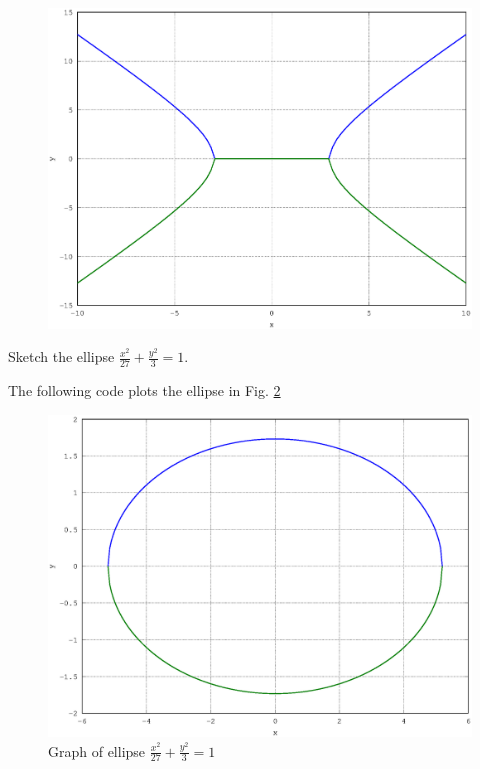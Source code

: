 \documentclass[journal,12pt,twocolumn]{IEEEtran}
\begin{document}
\begin{figure}
\begin{center}
\includegraphics[width=\columnwidth]{./version_2/ee16b1012/ee16b1012}
\end{center}
\label{fig_12}	
\end{figure}
%
\begin{problem}
Sketch the ellipse $\frac{x^2}{27} + \frac{y^2}{3} = 1$.
\end{problem}
\solution The following code plots the ellipse in Fig. \ref{fig_13}

\begin{figure}[h]
\centering
\includegraphics[width=\columnwidth]{./version_2/ee16b1013/ee16b1013}
\caption{Graph of ellipse $\displaystyle\frac{x^2}{27} +  \frac{y^2}{3} = 1$ }
\label{fig_13}	
\end{figure}
\end{document}
